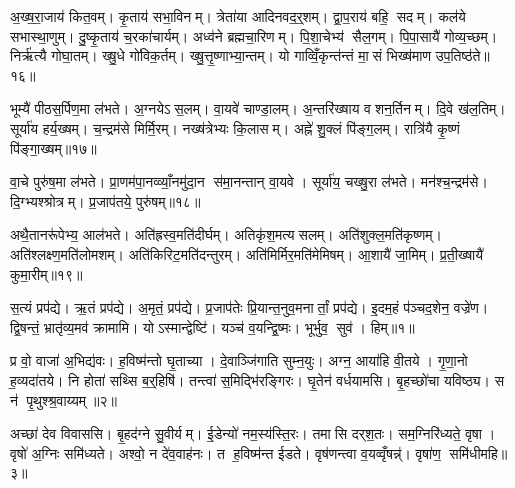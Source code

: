अ॒ख्ष॒रा॒जाय॑ कित॒वम्। कृ॒ताय॑ सभा॒विनम्। त्रेता॑या आदिनवद॒र्॒शम्। द्वा॒प॒राय॑ बहि॒ सदम्। कल॑ये सभास्था॒णुम्। दु॒ष्कृ॒ताय॑ च॒रका॑चार्यम्। अध्व॑ने ब्रह्मचा॒रिणम्। पि॒शा॒चेभ्य॑ सैल॒गम्। पि॒पा॒सायै॑ गोव्य॒च्छम्। निर्\mbox{}ऋ॑त्यै गोघा॒तम्। ख्षु॒धे गो॑विक॒र्तम्। ख्षु॒त्तृ॒ष्णाभ्या॒न्तम्। यो गाव्विँ॒कृन्त॑न्तं मा॒सं भिख्ष॑माण उप॒तिष्ठ॑ते॥१६॥

भूम्यै॑ पीठस॒र्पिण॒मा ल॑भते। अ॒ग्नयेऽस॒लम्। वा॒यवे॑ चाण्डा॒लम्। अ॒न्तरि॑ख्षाय वशन॒र्तिनम्। दि॒वे ख॑ल॒तिम्। सूर्या॑य हर्य॒ख्षम्। च॒न्द्रम॑से मिर्मि॒रम्। नख्ष॑त्रेभ्यः कि॒लासम्। अह्ने॑ शु॒क्लं पि॑ङ्ग॒लम्। रात्रि॑यै कृ॒ष्णं पि॑ङ्गा॒ख्षम्॥१७॥

वा॒चे पुरु॑ष॒मा ल॑भते। प्रा॒णम॑पा॒नव्व्याँ॒नमु॑दा॒न स॑मा॒नन्तान् वा॒यवे। सूर्या॑य॒ चख्षु॒रा ल॑भते। मन॑श्च॒न्द्रम॑से। दि॒ग्भ्यश्श्रोत्रम्। प्र॒जाप॑तये॒ पुरु॑षम्॥१८॥

अथै॒तानरू॑पेभ्य॒ आल॑भते। अति॑ह्रस्व॒मति॑दीर्घम्। अतिकृ॑श॒मत्यसलम्। अति॑शुक्ल॒मति॑कृष्णम्। अति॑श्लक्ष्ण॒मति॑लोमशम्। अति॑किरिट॒मति॑दन्तुरम्। अति॑मिर्मिर॒मति॑मेमिषम्। आ॒शायै॑ जा॒मिम्। प्र॒ती॒ख्षायै॑ कुमा॒रीम्॥१९॥



\clearpage
{}
\setcounter{anuvakam}{0}
स॒त्यं प्रप॑द्ये। ऋ॒तं प्रप॑द्ये। अ॒मृतं॒ प्रप॑द्ये। प्र॒जाप॑तेः प्रि॒यान्त॒नुव॒मनार्तां॒ प्रप॑द्ये। इ॒दम॒हं प॑ञ्चद॒शेन॒ वज्रे॑ण। द्वि॒षन्तं॒ भ्रातृ॑व्य॒मव॑ क्रामामि। योऽस्मान्द्वेष्टि॑। यञ्च॑ व॒यन्द्वि॒ष्मः। भूर्भुव॒ सुव॑। हिम्॥१॥\anuvakamend[स॒त्यन्दश॑]

प्र वो॒ वाजा॑ अ॒भिद्य॑वः। ह॒विष्म॑न्तो घृ॒ताच्या। दे॒वाञ्जि॑गाति सुम्न॒युः। अग्न॒ आया॑हि वी॒तये। गृ॒णा॒नो ह॒व्यदा॑तये। नि होता॑ सथ्सि ब॒र्॒हिषि॑। तन्त्वा॑ स॒मिद्भि॑रङ्गिरः। घृ॒तेन॑ वर्धयामसि। बृ॒हच्छो॑चा यविष्ठ्य। स न॑ पृ॒थुश्श्र॒वाय्यम्॥२॥

अच्छा॑ देव विवाससि। बृ॒हद॑ग्ने सु॒वीर्यम्। ई॒डेन्यो॑ नम॒स्य॑स्ति॒रः। तमासि दर्‌श॒तः। सम॒ग्निरि॑ध्यते॒ वृषा। वृषो॑ अ॒ग्निः समि॑ध्यते। अश्वो॒ न दे॑व॒वाह॑नः। त ह॒विष्म॑न्त ईडते। वृष॑णन्त्वा व॒यव्वृँषन्न्॑। वृषा॑ण॒ समि॑धीमहि॥३॥

